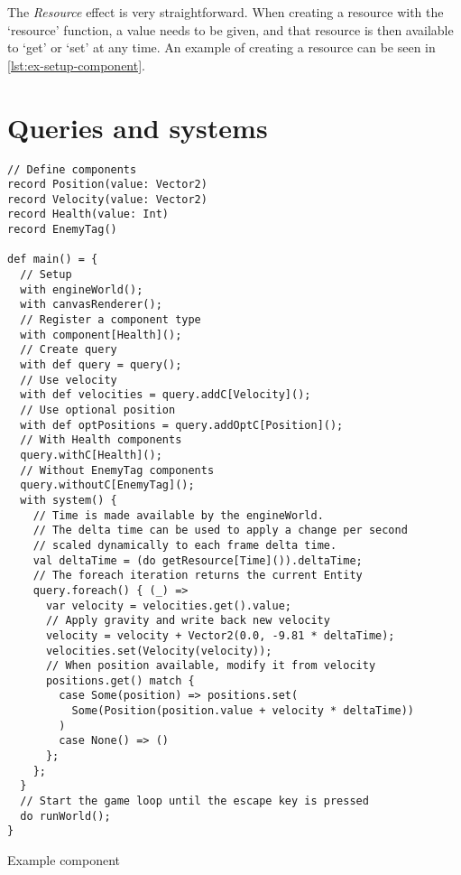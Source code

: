 The \textit{Resource} effect is very straightforward. When creating a resource with the `resource' function, a value needs to be given, and that resource is then available to `get' or `set' at any time. An example of creating a resource can be seen in \cref{lst:ex-setup-component}.

\section{Queries and systems}

\begin{listing}
\begin{lstlisting}
// Define components
record Position(value: Vector2)
record Velocity(value: Vector2)
record Health(value: Int)
record EnemyTag()

def main() = {
  // Setup
  with engineWorld();
  with canvasRenderer();
  // Register a component type
  with component[Health]();
  // Create query
  with def query = query();
  // Use velocity
  with def velocities = query.addC[Velocity]();
  // Use optional position
  with def optPositions = query.addOptC[Position]();
  // With Health components
  query.withC[Health]();
  // Without EnemyTag components
  query.withoutC[EnemyTag]();
  with system() {
    // Time is made available by the engineWorld.
    // The delta time can be used to apply a change per second
    // scaled dynamically to each frame delta time.
    val deltaTime = (do getResource[Time]()).deltaTime;
    // The foreach iteration returns the current Entity
    query.foreach() { (_) =>
      var velocity = velocities.get().value;
      // Apply gravity and write back new velocity
      velocity = velocity + Vector2(0.0, -9.81 * deltaTime);
      velocities.set(Velocity(velocity));
      // When position available, modify it from velocity
      positions.get() match {
        case Some(position) => positions.set(
          Some(Position(position.value + velocity * deltaTime))
        )
        case None() => ()
      };
    };
  }
  // Start the game loop until the escape key is pressed
  do runWorld();
}
\end{lstlisting}
\caption{Example component}
\label{lst:ex-query-system}
\end{listing}

